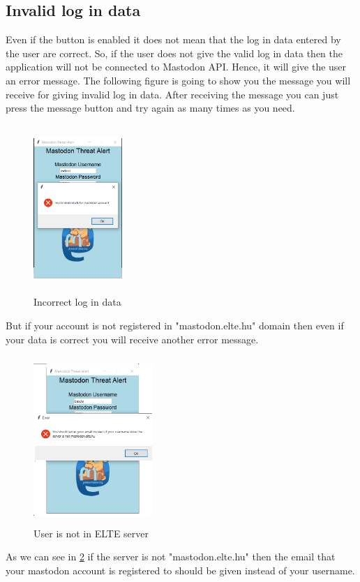 \subsection{Invalid log in data}
\label{ss:incorrect_data}
Even if the button is enabled it does not mean that the log in data entered by the user
are correct. So, if the user does not give the valid log in data then the application 
will not be connected to Mastodon API. Hence, it will give the user an error message.
The following figure is going to show you the message you will receive for giving invalid 
log in data. After receiving the message you can just press the message button and try again
as many times as you need.
\begin{figure}[H]
	\centering
	\includegraphics[width=0.3\textwidth,height=240px]{images/invalidred.png}
	\caption{Incorrect log in data}
	\label{fig:invalid_data}
\end{figure}
But if your account is not registered in "mastodon.elte.hu" domain then
even if your data is correct you will receive another error message.
\begin{figure}[H]
	\centering
	\includegraphics[width=0.4\textwidth,height=240px]{images/notelteserver.png}
	\caption{User is not in ELTE server}
	\label{fig:not_elte}
\end{figure}
As we can see in \ref{fig:not_elte} if the server is not "mastodon.elte.hu" then
the email that your mastodon account is registered to should be given instead of
your username.

